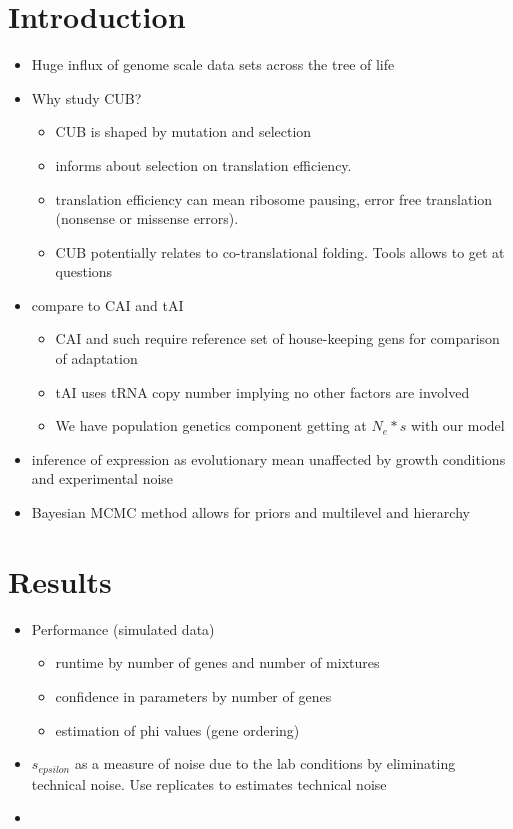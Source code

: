 \documentclass{bioinfo}
\begin{document}
\section*{Introduction}

\begin{itemize}
\item Huge influx of genome scale data sets across the tree of life
\item Why study CUB?
	\begin{itemize}
	\item CUB is shaped by mutation and selection
	\item informs about selection on translation efficiency.
	\item translation efficiency can mean ribosome pausing, error free translation (nonsense or missense errors).
	\item CUB potentially relates to co-translational folding. Tools allows to get at questions
	\end{itemize}
\item compare to CAI and tAI
	\begin{itemize}
	\item CAI and such require reference set of house-keeping gens for comparison of adaptation
	\item tAI uses tRNA copy number implying no other factors are involved
	\item We have population genetics component getting at $N_e * s$ with our model
	\end{itemize}
\item inference of expression as evolutionary mean unaffected by growth conditions and experimental noise
\item Bayesian MCMC method allows for priors and multilevel and hierarchy 
\end{itemize}



\section*{Results}
\begin{itemize}
\item Performance (simulated data)
	\begin{itemize}
	\item runtime by number of genes and number of mixtures
	\item confidence in parameters by number of genes
	\item estimation of phi values (gene ordering)
	\end{itemize}
\item $s_{epsilon}$ as a measure of noise due to the lab conditions by eliminating technical 			noise. Use replicates to estimates technical noise

\item 
\end{itemize}
\end{document}
